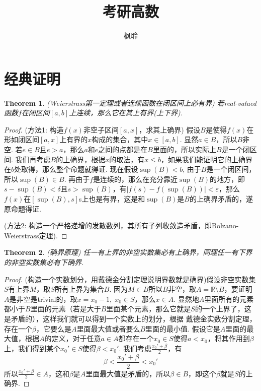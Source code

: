 \documentclass{article}
\newtheorem{theorem}{Theorem}[section]
\begin{document}
\title{考研高数}
\author{枫聆}
\maketitle
\tableofcontents

\newpage
\section{经典证明}
\begin{theorem}
\rm {\color{red} (Weierstrass第一定理或者连续函数在闭区间上必有界)} 若real-valued函数$f$在闭区间$[a,b]$上连续，那么它在其上有界(上下界).
\end{theorem}

\begin{proof}
{\color{blue} (方法1: 构造$f(x)$非空子区间$[a,x]$，求其上确界)} 假设$B$是使得$f(x)$在形如闭区间$[a,x]$上有界的$x$构成的集合，其中$x \in [a,b]$. 显然$a \in B$，所以$B$非空. 若$e \in B$且$e > a$，那么$a$和$e$之间的点都是在$B$里面的，所以实际上$B$是一个闭区间. 我们再考虑$B$的上确界，根据$x$的取法，有$x \leq b$，如果我们能证明它的上确界在$b$处取得，那么整个命题就得证. 现在假设$\sup(B) < b$, 由于$B$是一个闭区间，所以$\sup(B) \in B$. 再由于$f$是连续的，那么在充分靠近$\sup(B)$的地方，即$s -\sup(B) < \delta$且$s > \sup(B)$，有$|f(s) - f(\sup(B))| < \varepsilon$，那么$f(x)$在$[\sup(B),s]$s上也是有界，这是和$\sup(B)$是$B$的上确界矛盾的，遂原命题得证.

{\color{blue} (方法2: 构造一个严格递增的发散数列，其所有子列收敛造矛盾，即Bolzano-Weierstrass定理)}.
\end{proof}

\begin{theorem}
\rm {\color{red} (确界原理)} 任一有上界的非空实数集必有上确界，同理任一有下界的非空实数集必有下确界.
\end{theorem}

\begin{proof}
{\color{blue} (构造一个实数划分，用戴德金分割定理说明界数就是确界)}假设非空实数集$S$有上界$M$，取$S$所有上界为集合$B$. 因为$M \in B$所以$B$非空，取$A = \mathbb{R} \setminus B$，要证明$A$是非空是trivial的，取$x = x_0 - 1,\; x_0 \in S$，那么$x \in A$. 显然地$A$里面所有的元素都小于$B$里面的元素（若是大于$B$里面某个元素，那么它就是$S$的一个上界了，这是矛盾的），这样我们就可以得到一个实数上的划分，根据{\color{red} 戴德金实数分割定理}，存在一个$\beta$，它要么是$A$里面最大值或者要么$B$里面的最小值. 假设它是$A$里面的最大值，根据$A$的定义，对于任意$a \in A$都存在一个$x_0 \in S$使得$a < x_0$，将其作用到$\beta$上，我们得到某个$x_0' \in S$使得$\beta < x_0'$. 我们考虑$\frac{x_0'+\beta}{2}$，有
$$
\beta < \frac{x_0' + \beta}{2} < x_0'
$$
所以$\frac{x_0' + \beta}{2} \in A$，这和$\beta$是$A$里面最大值是矛盾的，所以$\beta \in B$，即这个$\beta$就是$S$的上确界.
\end{proof}
\end{document}
